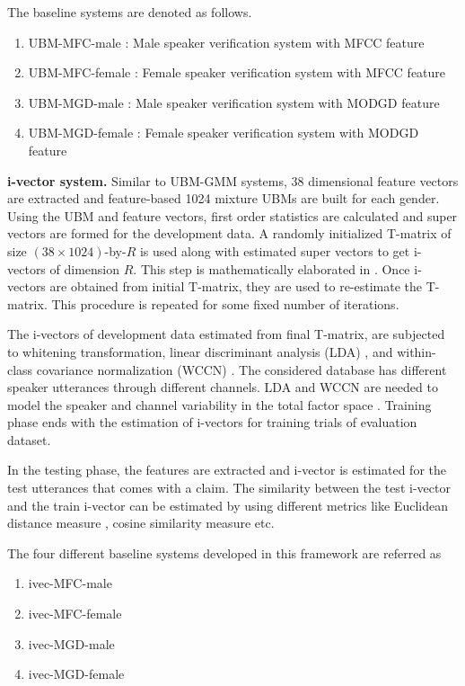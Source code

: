 \documentclass{article}
\begin{document}
\vspace*{0.25cm}
The baseline systems are denoted as follows.
\begin{enumerate}
\item UBM-MFC-male : Male speaker verification system with MFCC feature
\item UBM-MFC-female : Female speaker verification system with MFCC feature
\item UBM-MGD-male : Male speaker verification system with MODGD feature
\item UBM-MGD-female : Female speaker verification system with MODGD feature
\end{enumerate}

\textbf{i-vector system.} 
Similar to UBM-GMM systems, 38 dimensional feature vectors are extracted and feature-based 1024 mixture UBMs are built for each gender.  Using the UBM and feature vectors, first order statistics are calculated and super vectors are formed for the development data. A randomly initialized T-matrix of size $(38\times1024)$-by-$R$ is used along with estimated super vectors to get i-vectors of dimension $R$. This step is mathematically elaborated in \cite{dehak_ivector, kenny_JFA}. Once i-vectors are obtained from initial T-matrix, they are used to re-estimate the T-matrix. This procedure is repeated for some fixed number of iterations. 

\vspace*{0.25cm}
The  i-vectors of development data estimated from final T-matrix, are subjected to whitening transformation, linear discriminant analysis (LDA) \cite{lda, lda_tutorial}, and within-class covariance normalization (WCCN) \cite{dehak_ivector, wccn}. The considered database has different speaker utterances through different channels. LDA and WCCN are needed to model the speaker and channel variability in the total factor space \cite{dehak_ivector}. Training phase ends with the estimation of i-vectors for training trials of evaluation dataset. 

\vspace*{0.25cm}
In the testing phase, the features are extracted and i-vector is estimated for the test utterances that comes with a claim. The similarity between the test i-vector and the train i-vector can be estimated  by using different metrics like Euclidean distance measure \cite{euclid}, cosine similarity measure \cite{z_norm_cosine} etc. 

\vspace*{0.25cm}
The four different baseline systems developed in this framework are referred as 
\begin{enumerate}
\item ivec-MFC-male
\item ivec-MFC-female
\item ivec-MGD-male
\item ivec-MGD-female
\end{enumerate}
\end{document}
